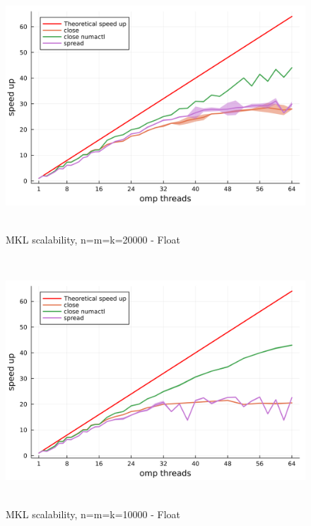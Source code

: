 \documentclass[
  letterpaper,
  DIV=11,
  numbers=noendperiod]{scrartcl}
\begin{document}
\begin{figure}

{\centering \includegraphics[width=\textwidth,height=3.64583in]{img/mkl_scalability_20000.png}

}

\caption{MKL scalability, n=m=k=20000 - Float}

\end{figure}

\begin{figure}

{\centering \includegraphics[width=\textwidth,height=3.64583in]{img/mkl_scalability_10000.png}

}

\caption{MKL scalability, n=m=k=10000 - Float}

\end{figure}
\end{document}
